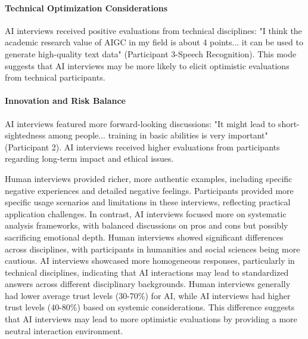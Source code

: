 \documentclass[sigchi,nonacm,manuscript]{acmart}
\begin{document}
\paragraph{Technical Optimization Considerations} AI interviews received positive evaluations from technical disciplines: "I think the academic research value of AIGC in my field is about 4 points... it can be used to generate high-quality text data" (Participant 3-Speech Recognition). This mode suggests that AI interviews may be more likely to elicit optimistic evaluations from technical participants.

\paragraph{Innovation and Risk Balance} AI interviews featured more forward-looking discussions: "It might lead to short-sightedness among people... training in basic abilities is very important" (Participant 2). AI interviews received higher evaluations from participants regarding long-term impact and ethical issues.

Human interviews provided richer, more authentic examples, including specific negative experiences and detailed negative feelings. Participants provided more specific usage scenarios and limitations in these interviews, reflecting practical application challenges. In contrast, AI interviews focused more on systematic analysis frameworks, with balanced discussions on pros and cons but possibly sacrificing emotional depth. Human interviews showed significant differences across disciplines, with participants in humanities and social sciences being more cautious. AI interviews showcased more homogeneous responses, particularly in technical disciplines, indicating that AI interactions may lead to standardized answers across different disciplinary backgrounds. Human interviews generally had lower average trust levels (30-70\%) for AI, while AI interviews had higher trust levels (40-80\%) based on systemic considerations. This difference suggests that AI interviews may lead to more optimistic evaluations by providing a more neutral interaction environment.
\end{document}
